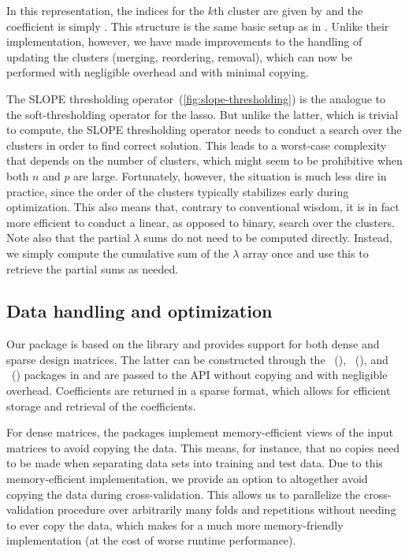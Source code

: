 \documentclass[article]{jss}
\begin{document}
In this representation, the indices for the \(k\)th cluster are given by  and the coefficient is simply .
This structure is the same basic setup as in \citet{larsson2023}. Unlike
their implementation, however, we have made improvements to the
handling of updating the clusters (merging,
reordering, removal), which can now be performed with negligible
overhead and with minimal copying.

The SLOPE thresholding operator~(\autoref{fig:slope-thresholding}) is the analogue
to the soft-thresholding operator for the lasso. But unlike the latter, which
is trivial to compute, the SLOPE thresholding operator needs to conduct a
search over the clusters in order to find correct solution. This leads to a
worst-case complexity that depends on the number of clusters, which might seem
to be prohibitive when both \(n\) and \(p\) are large. Fortunately, however,
the situation is much less dire in practice, since the order of the clusters
typically stabilizes early during optimization. This also means that, contrary
to conventional wisdom, it is in fact more efficient to conduct a linear, as opposed
to binary, search over the clusters. Note also that the partial \(\lambda\) sums
do not need to be computed directly. Instead, we simply compute the
cumulative sum of the \(\lambda\) array once and use this to retrieve
the partial sums as needed.

\subsection{Data handling and optimization}

Our package is based on the   library and provides
support for both dense and sparse design matrices. The latter can be
constructed through the ~(),
~(), and ~()
packages in and are passed to the  API without copying
and with negligible overhead. Coefficients are returned in a sparse format, which
allows for efficient storage and retrieval of the coefficients.

For dense matrices, the packages implement memory-efficient views of the input
matrices to avoid copying the data. This means, for instance, that no copies
need to be made when separating data sets into training and test data. Due to
this memory-efficient implementation, we provide an option to altogether avoid
copying the data during cross-validation. This allows us to parallelize the
cross-validation procedure over arbitrarily many folds and repetitions without
needing to ever copy the data, which makes for a much more memory-friendly
implementation (at the cost of worse runtime performance).
\end{document}
